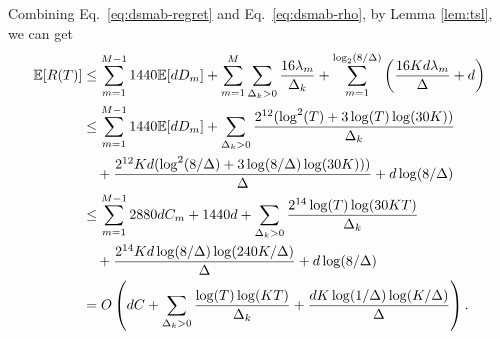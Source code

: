 Combining Eq.~\eqref{eq:dsmab-regret} and Eq.~\eqref{eq:dsmab-rho}, by Lemma \ref{lem:tsl}, we can get
\begin{equation*}
    \begin{split}
        {\mathbb{E}}[R(T)]
        &\leq \sum_{m=1}^{M-1} 1440 {\mathbb{E}}[dD_m] + \sum_{m=1}^M \sum_{\Delta_k > 0}\frac{16\lambda_m}{\Delta_k} + \sum_{m=1}^{\log_2(8/\Delta)}\left(\frac{16Kd\lambda_m}{\Delta} + d\right) \\
        &\leq \sum_{m=1}^{M-1} 1440 {\mathbb{E}}[dD_m] + \sum_{\Delta_k > 0}\frac{2^{12}(\log^2(T) + 3\log(T)\log(30K))}{\Delta_k} \\
        &\quad + \frac{2^{12}Kd(\log^2(8/\Delta) + 3\log(8/\Delta)\log(30K)))}{\Delta} + d\log(8/\Delta) \\
        &\leq \sum_{m=1}^{M-1} 2880 dC_m + 1440d + \sum_{\Delta_k > 0}\frac{2^{14}\log(T)\log(30KT)}{\Delta_k} \\
        &\quad+ \frac{2^{14}Kd\log(8/\Delta)\log(240K / \Delta)}{\Delta} + d\log(8/\Delta) \\ 
        &= O\left(dC + \sum_{\Delta_k > 0}\frac{\log(T)\log(KT)}{\Delta_k} + \frac{dK\log(1 / \Delta)\log(K / \Delta)}{\Delta}\right).
    \end{split}
\end{equation*}

